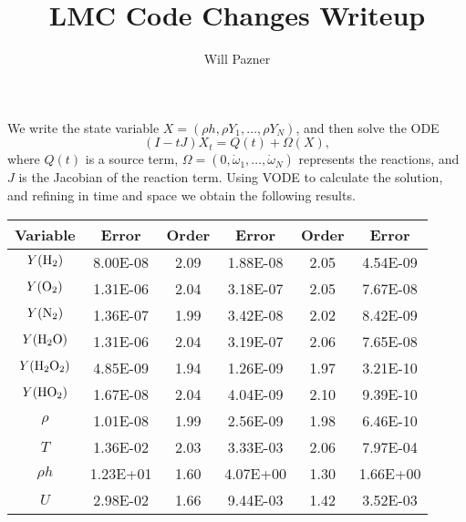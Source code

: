 \documentclass[12pt]{article}
\begin{document}
\title{LMC Code Changes Writeup}
\author{Will Pazner}
We write the state variable $X = (\rho h, \rho Y_1, \ldots, \rho Y_N)$, and then
solve the ODE
\[
   (I - t J)X_t = Q(t) + \Omega(X),
\]
where $Q(t)$ is a source term,
$\Omega = (0, \dot\omega_1, \ldots, \dot\omega_N)$ 
represents the reactions, and $J$ is the Jacobian of the reaction term.
Using VODE to calculate the solution, and refining in time and space we 
obtain the following results.



\begin{center}
\begin{tabular}{ c | c c c c c }
Variable                & Error    & Order& Error    & Order& Error    \\
\hline
$Y({\rm H}_2)$          & 8.00E-08 & 2.09 & 1.88E-08 & 2.05 & 4.54E-09 \\
$Y({\rm O}_2)$          & 1.31E-06 & 2.04 & 3.18E-07 & 2.05 & 7.67E-08 \\
$Y({\rm N}_2)$          & 1.36E-07 & 1.99 & 3.42E-08 & 2.02 & 8.42E-09 \\
$Y({\rm H}_2{\rm O})$   & 1.31E-06 & 2.04 & 3.19E-07 & 2.06 & 7.65E-08 \\
$Y({\rm H}_2{\rm O}_2)$ & 4.85E-09 & 1.94 & 1.26E-09 & 1.97 & 3.21E-10 \\
$Y({\rm HO}_2)$         & 1.67E-08 & 2.04 & 4.04E-09 & 2.10 & 9.39E-10 \\
$\rho$                  & 1.01E-08 & 1.99 & 2.56E-09 & 1.98 & 6.46E-10 \\
$T$                     & 1.36E-02 & 2.03 & 3.33E-03 & 2.06 & 7.97E-04 \\
$\rho h$                & 1.23E+01 & 1.60 & 4.07E+00 & 1.30 & 1.66E+00 \\
$U$                     & 2.98E-02 & 1.66 & 9.44E-03 & 1.42 & 3.52E-03 \\
\end{tabular}
\end{center}
\end{document}
